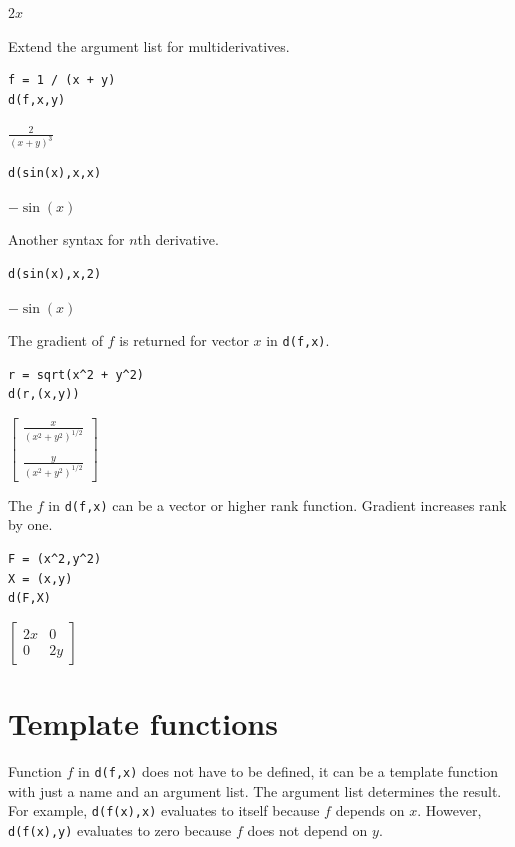 \documentclass[12pt]{article}
\begin{document}
$2x$

\bigskip
Extend the argument list for multiderivatives.

{\color{blue}
\begin{verbatim}
f = 1 / (x + y)
d(f,x,y)
\end{verbatim}}

$\displaystyle
\frac{2}{(x+y)^3}
$

{\color{blue}
\begin{verbatim}
d(sin(x),x,x)
\end{verbatim}}

$-\sin(x)$

\bigskip
Another syntax for $n$th derivative.

{\color{blue}
\begin{verbatim}
d(sin(x),x,2)
\end{verbatim}}

$-\sin(x)$

\bigskip
The gradient of $f$ is returned for vector $x$ in \verb$d(f,x)$.

{\color{blue}
\begin{verbatim}
r = sqrt(x^2 + y^2)
d(r,(x,y))
\end{verbatim}
}

$\displaystyle
\begin{bmatrix}
{\displaystyle \frac{x}{(x^2+y^2)^{1/2}}}
\\
\\
{\displaystyle \frac{y}{(x^2+y^2)^{1/2}}}
\end{bmatrix}
$

\bigskip
The $f$ in \verb$d(f,x)$ can be a vector or higher rank function.
Gradient increases rank by one.

{\color{blue}
\begin{verbatim}
F = (x^2,y^2)
X = (x,y)
d(F,X)
\end{verbatim}
}

$\displaystyle
\begin{bmatrix}
2x & 0
\\[1ex]
0 & 2y
\end{bmatrix}
$

\newpage

\section{Template functions}

Function $f$ in \verb$d(f,x)$ does not have to be defined,
it can be a template function with just a name and an argument list.
The argument list determines the result.
For example, \verb$d(f(x),x)$ evaluates to itself because $f$ depends on $x$.
However, \verb$d(f(x),y)$ evaluates to zero because $f$ does not depend on $y$.
\end{document}
